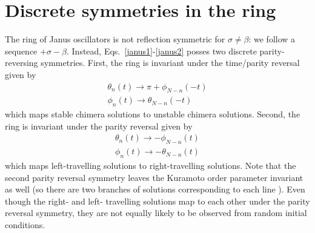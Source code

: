 \documentclass[aps,pre,amsmath,amssymb,floatfix,onecolumn,notitlepage,10pt]{revtex4-1}
\begin{document}
\section{Discrete symmetries in the ring}
The ring of Janus oscillators is not reflection symmetric for $\sigma \neq \beta$: we follow a sequence $+\sigma-\beta$. Instead, Eqs.~\eqref{janus1}-\eqref{janus2} posses two discrete parity-reversing symmetries. First, the ring is invariant under the time/parity reversal given by
\begin{align}
\theta_n(t)\to \pi+\phi_{N-n}(-t) \\
\phi_n(t)\to \theta_{N-n}(-t) \label{parity1}
\end{align}
which maps stable chimera solutions to unstable chimera solutions.  Second, the ring is invariant under the parity reversal given by
\begin{align}
\theta_n(t)\to -\phi_{N-n}(t) \\
\phi_n(t)\to -\theta_{N-n}(t) \label{parity2}
\end{align}
which maps left-travelling solutions to right-travelling solutions. Note that the second parity reversal symmetry leaves the Kuramoto order parameter invariant as well (so there are two branches of solutions corresponding to each line ). Even though the right- and left- travelling solutions map to each other under the parity reversal symmetry, they are not equally likely to be observed from random initial conditions.
\end{document}
